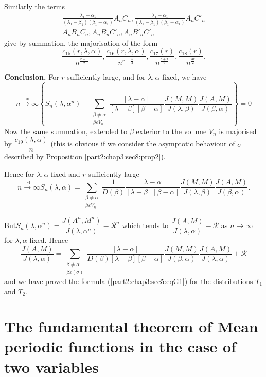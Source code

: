 Similarly the terms
\begin{gather*}
  \frac{\lambda_1- \alpha_1}{(\lambda_1- \beta_1)(\beta_1-\alpha_1)}
  A_n C_n,\frac{\lambda_1- \alpha_1}{(\lambda_1-
    \beta_1)(\beta_1-\alpha_1)} A_n C'_n \\ 
  A_nB_nC_n,A_nB_nC'_n,A_nB'_nC'_n
\end{gather*}
give by summation, the majorisation of the form
$$
\frac{c_{15}(r,\lambda,\alpha)}{n^{\frac{r+1}{2}}},\frac{c_{16}(r,\lambda,
  \alpha)}{n^{r -\frac{5}{2}}}, \frac{c_{17}(r)}{n^{\frac{r+7}{2}}},
\frac{c_{18}(r)}{n^{\frac{3r}{2}}}. 
$$

\noindent
\textbf{Conclusion.} For $r$ sufficiently large, and for $\lambda,
\alpha$ fixed, we have 
$$
\overset{\Lt}{n \to \infty}  \left \{ S_n (\lambda, \alpha^n)-\sum
_{\substack {\beta  \neq \alpha \\{\beta \varepsilon  V_n}}}\frac{[\lambda-
    \alpha]}{[\lambda- \beta][\beta-\alpha]}
\frac{J(M,M)}{J(\lambda,\beta)} \frac{J(A,M)}{J(\beta,\alpha)} \right
\}=0 
$$
Now the same summation, extended to $\beta$ exterior to the volume
$V_n$ is majorised by $\dfrac {c_{19}(\lambda, \alpha)}{n}$ (this is
obvious if we consider the asymptotic behaviour of $\sigma$ described
by Proposition \ref{part2:chap3:sec8:prop2}). 

Hence for $\lambda,\alpha$ fixed and $r$ sufficiently large
$$
\overset{\Lt}{n \to\infty}   S_n (\lambda, \alpha)=\sum _{\substack
  {\beta  \neq \alpha \\{\beta \varepsilon  V_n}}} \frac{1}{D(\beta)}\frac{[\lambda-
    \alpha]}{[\lambda- \beta][\beta-\alpha]}
\frac{J(M,M)}{J(\lambda,\beta)} \frac{J(A,M)}{J(\beta,\alpha)} . 
$$

But\pageoriginale $S_n (\lambda, \alpha^n)
=\dfrac{J(A^n,M^n)}{J(\lambda,\alpha^n)}-\mathscr{R}^n$ which tends to
$\dfrac{J(A,M)}{J(\lambda,\alpha)}-\mathscr{R}$ as $n \to \infty $ for
$\lambda, \alpha$ fixed. Hence 
$$
\frac{J(A,M)}{J(\lambda,\alpha)}=\sum _{\substack {\beta  \neq \alpha
    \\{\beta \varepsilon  (\sigma)}}}\frac{[\lambda- \alpha]}{D(\beta)[\lambda-
    \beta][\beta-\alpha]}
\frac{J(M,M)}{J(\beta,\alpha)}\frac{J(A,M)}{J(\lambda,\alpha)}+\mathscr{R} 
$$
and we have proved the formula (\ref{part2:chap3:sec5:eqG1}) for the
distributions $T_1$ and $T_2$. 

\section[The fundamental theorem of Mean...]{The fundamental theorem of Mean periodic functions in the
  case of two variables}\label{part2:chap3:sec9}%

